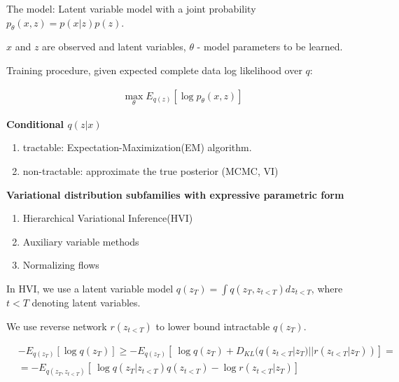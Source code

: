 \documentclass[10pt,letterpaper]{article}
\begin{document}

The model:
Latent variable model with a joint probability $ p_{\theta}(x, z) = p(x|z)p(z)$.

$x$ and $z$ are observed and latent variables, $\theta$ - model parameters to be learned.

Training procedure, given expected complete data log likelihood over $q$:

\begin{align*}
    \max_{\theta}E_{q(z)} [\log p_{\theta}(x, z)]
\end{align*}

\textbf{Conditional $q(z|x)$}
\begin{enumerate}{}
    \item tractable: Expectation-Maximization(EM) algorithm.
    \item non-tractable: approximate the true posterior (MCMC, VI)
\end{enumerate}




\textbf{Variational distribution subfamilies with expressive parametric form}
\begin{enumerate}
    \item Hierarchical Variational Inference(HVI) 
    \item Auxiliary variable methods
    \item Normalizing flows
\end{enumerate}

In HVI, we use a latent variable model $q(z_T) = \int q(z_T, z_{t<T}) d z_{t < T} $, where $t < T$ denoting latent variables.

We use reverse network $r(z_{t < T} )$ to lower bound intractable $q(z_T)$.

\begin{align*}
    &- E_{q(z_T)}[\log q(z_T)] \ge -E_{q(z_T)}[\ 
    \log q(z_T) + D_{KL}(q(z_{t<T} | z_T) || r(z_{t<T} | z_T))] = \\
    &= -E_{q(z_T, z_{t<T})}[\ 
    \log q(z_T | z_{t<T}) q(z_{t<T}) - \log r(z_{t<T} | z_T) ]
\end{align*}
\end{document}
